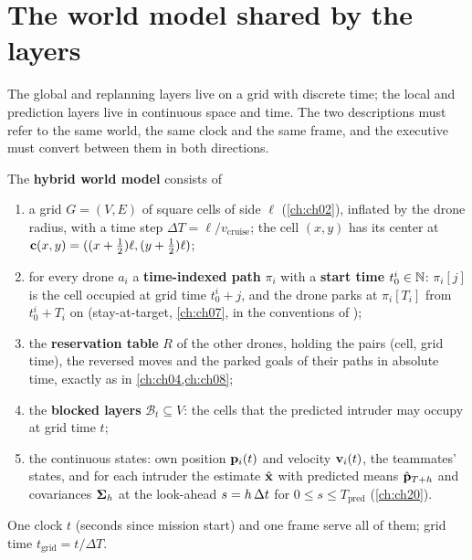 \section{The world model shared by the layers}
\label{sec:ch24-world}

The global and replanning layers live on a grid with discrete time; the
local and prediction layers live in continuous space and time. The two
descriptions must refer to the same world, the same clock and the same
frame, and the executive must convert between them in both directions.

\begin{definition}
\label{def:ch24-world}
The \textbf{hybrid world model} consists of
\begin{enumerate}
  \item a grid $G = (V, E)$ of square cells of side $\ell$ (\cref{ch:ch02}),
  inflated by the drone radius, with a time step $\Delta T = \ell / v_{\mathrm{cruise}}$;
  the cell $(x, y)$ has its center at $\mathbf{c}(x,y) = ((x + \tfrac12)\ell, (y + \tfrac12)\ell)$;
  \item for every drone $a_i$ a \textbf{time-indexed path} $\pi_i$ with a
  \textbf{start time} $t_0^i \in \mathbb{N}$: $\pi_i[j]$ is the cell
  occupied at grid time $t_0^i + j$, and the drone parks at $\pi_i[T_i]$ from
  $t_0^i + T_i$ on (stay-at-target, \cref{ch:ch07}, in the conventions of
  \textcite{stern2019mapf});
  \item the \textbf{reservation table} $R$ of the
  other drones, holding the pairs (cell, grid time), the reversed moves and the
  parked goals of their paths in absolute time, exactly as in \cref{ch:ch04,ch:ch08};
  \item the \textbf{blocked layers} $\mathcal{B}_t \subseteq V$: the cells that the
  predicted intruder may occupy at grid time $t$;
  \item the continuous states: own position $\mathbf{p}_i(t)$ and velocity
  $\mathbf{v}_i(t)$, the teammates' states, and for each intruder the estimate
  $\hat{\mathbf{x}}$ with predicted means $\hat{\mathbf{p}}_{T+h}$ and covariances
  $\mathbf{\Sigma}_h$ at the look-ahead $s = h\,\Delta t$ for $0 \le s \le T_{\mathrm{pred}}$ (\cref{ch:ch20}).
\end{enumerate}
One clock $t$ (seconds since mission start) and one frame serve all of them;
grid time $t_{\mathrm{grid}} = t / \Delta T$.
\end{definition}


